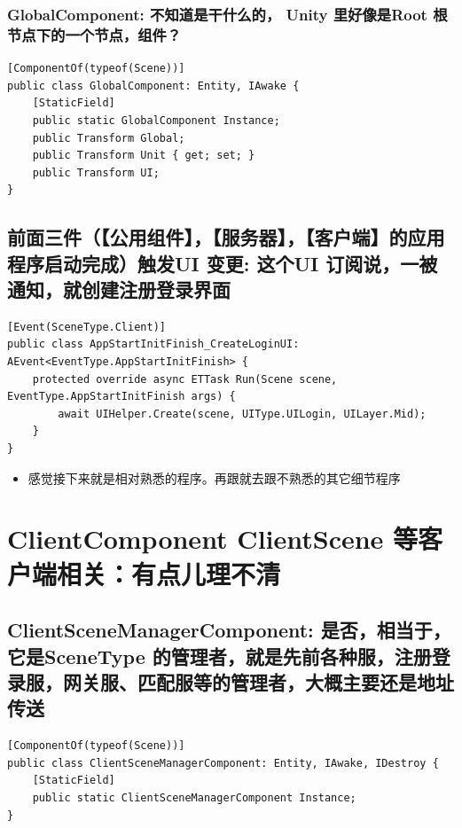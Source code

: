 \documentclass[9pt, b5paper]{article}
\begin{document}
\subsubsection{GlobalComponent: 不知道是干什么的， Unity 里好像是Root 根节点下的一个节点，组件？}
\label{sec-1-5-2}
\begin{verbatim}
[ComponentOf(typeof(Scene))]
public class GlobalComponent: Entity, IAwake {
    [StaticField]
    public static GlobalComponent Instance;
    public Transform Global;
    public Transform Unit { get; set; }
    public Transform UI;
}
\end{verbatim}
\subsection{前面三件（【公用组件】，【服务器】，【客户端】的应用程序启动完成）触发UI 变更: 这个UI 订阅说，一被通知，就创建注册登录界面}
\label{sec-1-6}
\begin{verbatim}
[Event(SceneType.Client)]
public class AppStartInitFinish_CreateLoginUI: AEvent<EventType.AppStartInitFinish> {
    protected override async ETTask Run(Scene scene, EventType.AppStartInitFinish args) {
        await UIHelper.Create(scene, UIType.UILogin, UILayer.Mid);
    }
}
\end{verbatim}
\begin{itemize}
\item 感觉接下来就是相对熟悉的程序。再跟就去跟不熟悉的其它细节程序
\end{itemize}


\section{ClientComponent ClientScene 等客户端相关：有点儿理不清}
\label{sec-2}

\subsection{ClientSceneManagerComponent: 是否，相当于，它是SceneType 的管理者，就是先前各种服，注册登录服，网关服、匹配服等的管理者，大概主要还是地址传送}
\label{sec-2-1}
\begin{verbatim}
[ComponentOf(typeof(Scene))]
public class ClientSceneManagerComponent: Entity, IAwake, IDestroy {
    [StaticField]
    public static ClientSceneManagerComponent Instance;
}
\end{verbatim}
\end{document}
